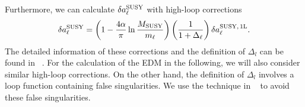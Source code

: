 \documentclass[a4paper,11pt]{article}
\begin{document}
   Furthermore, we can calculate $\delta a_{\ell}^{\rm SUSY}$ with high-loop corrections
   \begin{equation}\label{eq:MDM2loop}
      \delta a_\ell^{\rm SUSY}=\left(1-\frac{4\alpha}{\pi}\ln\frac{M_{\rm SUSY}}{m_\ell}\right)\left(\frac{1}{1+\Delta_\ell}\right)\delta a_\ell^{\rm SUSY,\,1L}.
   \end{equation}
    The detailed information of these corrections and the definition of $\Delta_l$ can be found in ~\cite{Degrassi:1998es,Marchetti:2008hw,Carena:1999py}. For the calculation of the EDM in the following, we will also consider similar high-loop corrections. 
    On the other hand, the definition of $\Delta_l$ involves a loop function containing false singularities. We use the technique in ~\cite{Li:2021koa} to avoid these false singularities. 
   
\end{document}
